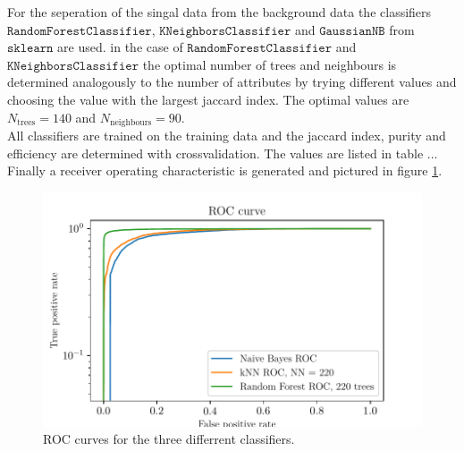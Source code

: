 For the seperation of the singal data from the background data the classifiers $\texttt{RandomForestClassifier}$, $\texttt{KNeighborsClassifier}$
and $\texttt{GaussianNB}$ from $\texttt{sklearn}$ are used. in the case of $\texttt{RandomForestClassifier}$ and  $\texttt{KNeighborsClassifier}$ 
the optimal number of trees and neighbours is determined analogously to the number of attributes by trying different values and choosing 
the value with the largest jaccard index. The optimal values are $N_\text{trees} = 140$ and $N_\text{neighbours} = 90$.\\
All classifiers are trained on the training data and the jaccard index, purity and efficiency are determined with crossvalidation. 
The values are listed in table ... \\
Finally a receiver operating characteristic is generated and pictured in figure \ref{fig:ROC}.

\begin{figure}[tb]
  \centering
  \includegraphics[width=12cm,keepaspectratio]{plots/ROC.pdf}
  \caption{ROC curves for the three differrent classifiers.}
  \label{fig:ROC}
\end{figure}
